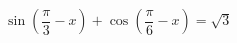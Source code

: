 \begin{ex}[type=equation]
	\begin{condition}
		$\ \sin{\left( \dfrac{\pi}{3}-x\right)} + \cos{\left( \dfrac{\pi}{6}-x\right)}=\sqrt{3}$
	\end{condition}
\end{ex}